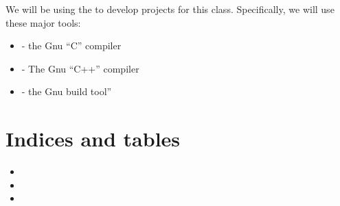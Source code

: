 \documentclass[letterpaper,11pt,english]{sphinxmanual}
\begin{document}
We will be using the  to develop projects for
this class. Specifically, we will use these major tools:
\begin{itemize}
\item {} 
 - the Gnu “C” compiler

\item {} 
 - The Gnu “C++” compiler

\item {} 
 - the Gnu build tool”

\end{itemize}


\chapter{Indices and tables}
\label{\detokenize{index:indices-and-tables}}\begin{itemize}
\item {} 

\item {} 

\item {} 

\end{itemize}



\renewcommand{\indexname}{Index}
\printindex
\end{document}
